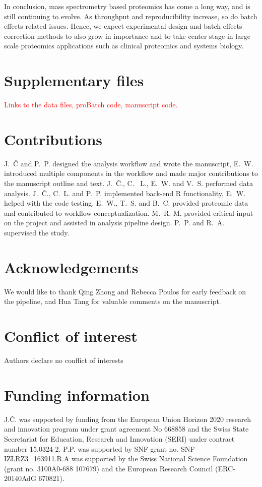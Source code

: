 \documentclass[num-refs]{wiley-article}
\begin{document}
In conclusion, mass spectrometry based proteomics has come a long way, and is still continuing to evolve. As throughput and reproducibility increase, so do batch effects-related issues. Hence, we expect experimental design and batch effects correction methods to also grow in importance and to take center stage in  large scale proteomics applications such as clinical proteomics and systems biology.


\section*{Supplementary files}
\textcolor{red}{Links to the data files, proBatch code, manuscript code.}

\section*{Contributions}
J.~Č and P.~P. designed the analysis workflow and wrote the manuscript, E.~W. introduced multiple components in the workflow and made major contributions to the manuscript outline and text. J.~Č., C. ~L., E.~W. and V.~S. performed data analysis. J.~Č., C.~L. and P.~P. implemented back-end R functionality, E.~W. helped with the code testing. E.~W., T.~S. and B.~C. provided proteomic data and contributed to workflow conceptualization. M.~R.-M. provided critical input on the project and assisted in analysis pipeline design. P.~P. and R.~A. supervised the study.

\section*{Acknowledgements}
We would like to thank Qing Zhong and Rebecca Poulos for early feedback on the pipeline, and Hua Tang for valuable comments on the manuscript. 

\section*{Conflict of interest}
Authors declare no conflict of interests

\section*{Funding information}
J.Č. was supported by funding from the European Union Horizon 2020 research and innovation program under grant agreement No 668858 and the Swiss State Secretariat for Education, Research and Innovation (SERI) under contract number 15.0324-2. P.P. was supported by SNF grant no. SNF IZLRZ3\_163911.R.A was supported by the Swiss National Science Foundation (grant no. 3100A0-688 107679) and the European Research Council (ERC-20140AdG 670821).
\end{document}
